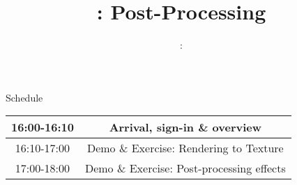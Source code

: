 \usepackage{../../beamerthemeFalmouthGamesAcademy}
\usepackage{multimedia}
\graphicspath{ {../../} }




\usepackage[normalem]{ulem}
\usepackage{wasysym}

\usepackage{pdfpages}

\usepackage{caption}
\captionsetup[figure]{font=scriptsize,labelfont=scriptsize}

\usetikzlibrary{arrows,automata}




\title{\sessionnumber: Post-Processing}
\subtitle{\modulecode: \moduletitle}

\frame{\titlepage} 





\begin{frame}{Schedule}
	\begin{center}
		\begin{tabular}{|c c|}
			\hline
			16:00-16:10 & Arrival, sign-in \& overview \\
			\hline
			16:10-17:00 & Demo \& Exercise: Rendering to Texture \\
			17:00-18:00 & Demo \& Exercise: Post-processing effects \\
			\hline
		\end{tabular}
	\end{center}
\end{frame}





